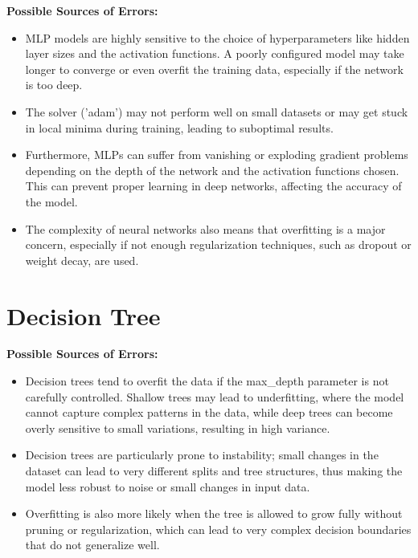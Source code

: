 \documentclass[12pt]{report}
\begin{document}
\textbf{Possible Sources of Errors:} 
\begin{itemize}
    \item MLP models are highly sensitive to the choice of hyperparameters like hidden layer sizes and the activation functions. A poorly configured model may take longer to converge or even overfit the training data, especially if the network is too deep.
    \item The solver ('adam') may not perform well on small datasets or may get stuck in local minima during training, leading to suboptimal results.
    \item Furthermore, MLPs can suffer from vanishing or exploding gradient problems depending on the depth of the network and the activation functions chosen. This can prevent proper learning in deep networks, affecting the accuracy of the model.
    \item The complexity of neural networks also means that overfitting is a major concern, especially if not enough regularization techniques, such as dropout or weight decay, are used.
\end{itemize}

\section{Decision Tree}

\textbf{Possible Sources of Errors:} 
\begin{itemize}
    \item Decision trees tend to overfit the data if the max\_depth parameter is not carefully controlled. Shallow trees may lead to underfitting, where the model cannot capture complex patterns in the data, while deep trees can become overly sensitive to small variations, resulting in high variance.
    \item Decision trees are particularly prone to instability; small changes in the dataset can lead to very different splits and tree structures, thus making the model less robust to noise or small changes in input data.
    \item Overfitting is also more likely when the tree is allowed to grow fully without pruning or regularization, which can lead to very complex decision boundaries that do not generalize well.
\end{itemize}
\end{document}
